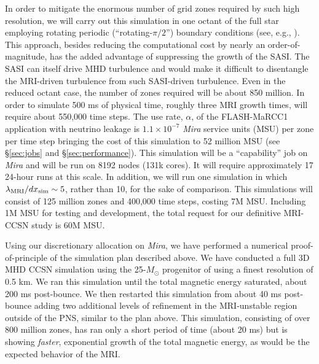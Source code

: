 In order to mitigate the enormous number of grid zones required by such high resolution, we will carry out this simulation in one octant of the full star employing rotating periodic (``rotating-$\pi/2$'') boundary conditions (see, e.g., \citep{Ott:2012ib}).  
This approach, besides reducing the computational cost by nearly an order-of-magnitude, has the added advantage of suppressing the growth of the SASI.  
The SASI can itself drive MHD turbulence \citep{Endeve:2012ht} and would make it difficult to disentangle the MRI-driven turbulence from such SASI-driven turbulence.  
Even in the reduced octant case, the number of zones required will be about 850 million.  
In order to simulate 500 ms of physical time, roughly three MRI growth times, will require about 550,000 time steps.  
The use rate, $\alpha$, of the FLASH-MaRCC1 application with neutrino leakage is $1.1\times10^{-7}$ {\it Mira} service units (MSU) per zone per time step bringing the cost of this simulation to 52 million MSU (see \S\ref{sec:jobs} and \S\ref{sec:performance}).  
This simulation will be a ``capability'' job on {\it Mira} and will be run on 8192 nodes (131k cores).  
It will require approximately 17 24-hour runs at this scale.  
In addition, we will run one simulation in which $\lambda_{\rm MRI} / dx_{\rm sim} \sim 5$, rather than 10, for the sake of comparison.  
This simulations will consist of 125 million zones and 400,000 time steps, costing 7M MSU.  
Including 1M MSU for testing and development, the total request for our definitive MRI-CCSN study is 60M MSU.

Using our discretionary allocation on {\it Mira}, we have performed a numerical proof-of-principle of the simulation plan described above.
We have conducted a full 3D MHD CCSN simulation using the 25-$M_\odot$ progenitor of \citet{Heger:2005bi} using a finest resolution of 0.5 km.
We ran this simulation until the total magnetic energy saturated, about 200 ms post-bounce.
We then restarted this simulation from about 40 ms post-bounce adding two additional levels of refinement in the MRI-unstable region outside of the PNS, similar to the plan above.
This simulation, consisting of over 800 million zones, has ran only a short period of time (about 20 ms) but is showing {\it faster}, exponential growth of the total magnetic energy, as would be the expected behavior of the MRI.

